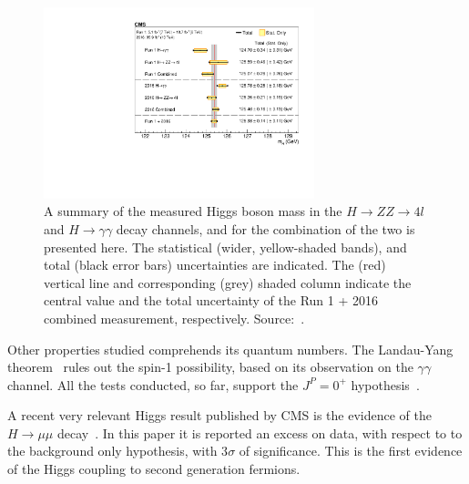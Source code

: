 \begin{figure}[htbp]
  \centering
  \includegraphics[width=0.7\textwidth]{figures_and_tables/theory/cms_higgs_mass.pdf}
  \caption{ A summary of the measured Higgs boson mass in the $H \rightarrow ZZ \rightarrow 4l$ and $H \rightarrow \gamma\gamma$ decay channels, and for the combination of the two is presented here. The statistical (wider, yellow-shaded bands), and total (black error bars) uncertainties are indicated. The (red) vertical line and corresponding (grey) shaded column indicate the central value and the total uncertainty of the Run 1 + 2016 combined measurement, respectively. Source:~\cite{Sirunyan:2020xwk}.}
  \label{higgs_mass}
\end{figure}

Other properties studied comprehends its quantum numbers. The Landau-Yang theorem~\cite{Landau:1948kw,Yang:1950rg} rules out the spin-1 possibility, based on its observation on the $\gamma\gamma$ channel. All the tests conducted, so far, support the $J^P = 0^+$ hypothesis~\cite{cms_higgs_spin_tests}.

A recent very relevant Higgs result published by CMS is the evidence of the $H \rightarrow \mu\mu$ decay~\cite{cms_higgs_mumu}. In this paper it is reported an excess on data, with respect to to the background only hypothesis, with 3$\sigma$ of significance. This is the first evidence of the Higgs coupling to second generation fermions.

